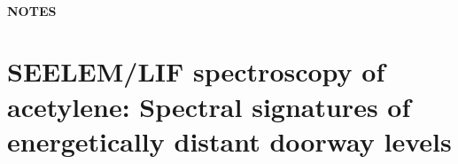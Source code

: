 \documentclass[12pt]{mitthesis}
\newcommand{\TODO} [1]{\textcolor{magenta}{\textbf{TODO:} #1}}
\newcommand{\bigspace}{$
  \;
  $}
\newcommand{\AtoX}{$
  \tilde{A} \: ^1\!A_u 
  \leftarrow 
  \tilde{X} \: ^1\Sigma_g^+
  $}
\newcommand{\StoS}{$
  S_1 \leftarrow S_0
  $}
\begin{document}
\tableofcontents
\clearpage

\subsubsection*{NOTES}

\clearpage

\setcounter{chapter}{3}
\chapter{SEELEM/LIF spectroscopy of acetylene: Spectral signatures of
  energetically distant doorway levels}



\end{document}
